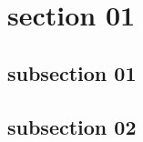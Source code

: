\documentclass[class=book, crop=false]{standalone}
\begin{document}
\section{section 01}
\subsection{subsection 01}

\paragraph*{}
\blindmathpaper

\cite{knuth:1984}

\subsection{subsection 02}

\paragraph*{}
\blindtext
\end{document}
